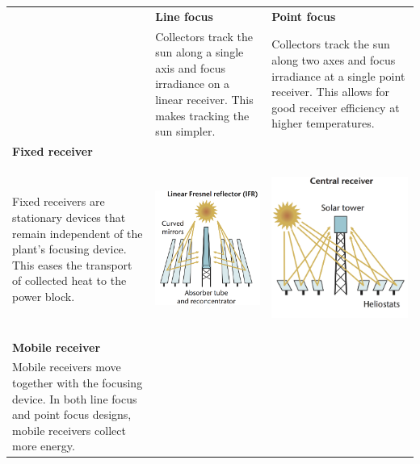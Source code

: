 \begin{table}[h!] %
  \centering
  \begin{tabular}{  m{5cm}  m{5cm}  m{5cm}  }
    \hline
    & \textbf{Line focus} & \textbf{Point focus} \\ 
    & Collectors track the sun along a single axis and focus irradiance on a linear receiver. This makes tracking the sun simpler. & Collectors track the sun along two axes and focus irradiance at a single point receiver. This allows for good receiver efficiency at higher temperatures.\\ \hline \hline
    \textbf{Fixed receiver} & &\\

    Fixed receivers are stationary devices that remain independent of the plant’s focusing device. This eases the transport of collected heat to the power block.
    &
    \begin{minipage}[t]{5cm}
      \centering
	 \includegraphics[height=55mm]{FIG/SUM/LF}
    \end{minipage}
    & 
    \begin{minipage}[t]{5cm}
      \centering
	  \includegraphics[height=55mm]{FIG/SUM/ST}
    \end{minipage}
    \\ \hline
    \textbf{Mobile receiver} & & \\
    Mobile receivers move together with the focusing device. In both line focus and point focus designs, mobile receivers collect more energy.

\end{tabular}
\end{table}
